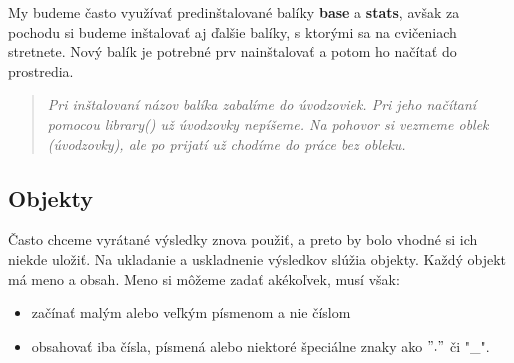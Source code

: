 \begin{Shaded}
\begin{Highlighting}[]

\end{Highlighting}
\end{Shaded}

My budeme často využívať predinštalované balíky \textbf{base} a
\textbf{stats}, avšak za pochodu si budeme inštalovať aj ďalšie balíky,
s ktorými sa na cvičeniach stretnete. Nový balík je potrebné prv
nainštalovať a potom ho načítať do prostredia.

\begin{Shaded}
\begin{Highlighting}[]

\NormalTok{(}\NormalTok{)}



\end{Highlighting}
\end{Shaded}

\begin{quote}
\emph{Pri inštalovaní názov balíka zabalíme do úvodzoviek. Pri jeho
načítaní pomocou library() už úvodzovky nepíšeme. Na pohovor si vezmeme
oblek (úvodzovky), ale po prijatí už chodíme do práce bez obleku.}
\end{quote}

\hypertarget{objekty}{%
\subsection{Objekty}\label{objekty}}

Často chceme vyrátané výsledky znova použiť, a preto by bolo vhodné si
ich niekde uložiť. Na ukladanie a uskladnenie výsledkov slúžia objekty.
Každý objekt má meno a obsah. Meno si môžeme zadať akékoľvek, musí však:

\begin{itemize}
\tightlist
\item
  začínať malým alebo veľkým písmenom a nie číslom
\item
  obsahovať iba čísla, písmená alebo niektoré špeciálne znaky ako
  \("."\) či "\_".
\end{itemize}

